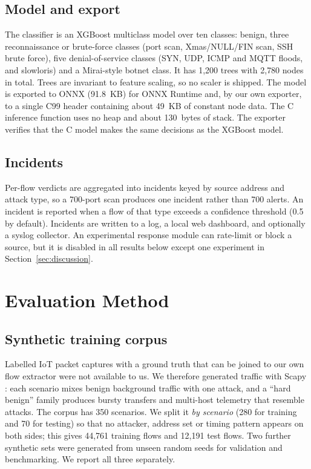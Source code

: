 \documentclass[conference]{IEEEtran}
\begin{document}
\subsection{Model and export}
The classifier is an XGBoost multiclass model \cite{chen2016xgboost} over
ten classes: benign, three reconnaissance or brute-force classes (port scan,
Xmas/NULL/FIN scan, SSH brute force), five denial-of-service classes (SYN,
UDP, ICMP and MQTT floods, and slowloris) and a Mirai-style botnet class.
It has 1{,}200 trees with 2{,}780 nodes in total. Trees are invariant to
feature scaling, so no scaler is shipped. The model is exported to ONNX
(91.8~KB) for ONNX Runtime \cite{onnxruntime} and, by our own exporter, to
a single C99 header containing about 49~KB of constant node data. The C
inference function uses no heap and about 130~bytes of stack. The exporter
verifies that the C model makes the same decisions as the XGBoost model.

\subsection{Incidents}
Per-flow verdicts are aggregated into incidents keyed by source address and
attack type, so a 700-port scan produces one incident rather than 700
alerts. An incident is reported when a flow of that type exceeds a
confidence threshold (0.5 by default). Incidents are written to a log, a
local web dashboard, and optionally a syslog collector. An experimental
response module can rate-limit or block a source, but it is disabled in
all results below except one experiment in Section~\ref{sec:discussion}.

\section{Evaluation Method}\label{sec:method}

\subsection{Synthetic training corpus}
Labelled IoT packet captures with a ground truth that can be joined to our
own flow extractor were not available to us. We therefore generated
traffic with Scapy \cite{scapy}: each scenario mixes benign background
traffic with one attack, and a ``hard benign'' family produces bursty
transfers and multi-host telemetry that resemble attacks. The corpus has
350 scenarios. We split it \emph{by scenario} (280 for training and 70 for
testing) so that no attacker, address set or timing pattern appears on
both sides; this gives 44{,}761 training flows and 12{,}191 test flows.
Two further synthetic sets were generated from unseen random seeds for
validation and benchmarking. We report all three separately.
\end{document}
